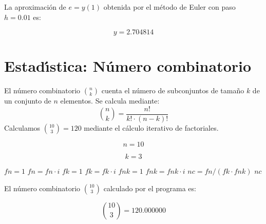 \documentclass{article}
\begin{document}
La aproximaci\'on de $e = y(1)$ obtenida por el m\'etodo de Euler con paso $h = 0.01$ es:

\begin{equation}
    y =
    2.704814
    \label{eq:res:y}
\end{equation}


\section{Estad\'{\i}stica: N\'umero combinatorio}

El n\'umero combinatorio $\binom{n}{k}$ cuenta el n\'umero de subconjuntos de tama\~no
$k$ de un conjunto de $n$ elementos. Se calcula mediante:
\[
    \binom{n}{k} = \frac{n!}{k! \cdot (n-k)!}
\]
Calculamos $\binom{10}{3} = 120$ mediante el c\'alculo iterativo de factoriales.

\begin{equation}
    n = 10
    \label{eq:calc:n}
\end{equation}

\begin{equation}
    k = 3
    \label{eq:calc:k}
\end{equation}

\begin{algorithm}
\caption{C\'alculo de $\binom{n}{k}$ mediante factoriales iterativos}
\label{alg:calc:nc}
\begin{algorithmic}
    \STATE $fn = 1$
        \STATE $fn = fn \cdot i$
    \ENDFOR
    \STATE $fk = 1$
        \STATE $fk = fk \cdot i$
    \ENDFOR
    \STATE $fnk = 1$
        \STATE $fnk = fnk \cdot i$
    \ENDFOR
    \STATE $nc = fn / (fk \cdot fnk)$
    \RETURN $nc$
\end{algorithmic}
\end{algorithm}

El n\'umero combinatorio $\binom{10}{3}$ calculado por el programa es:

\begin{equation}
    \binom{10}{3} =
    120.000000
    \label{eq:res:nc}
\end{equation}

\end{document}
